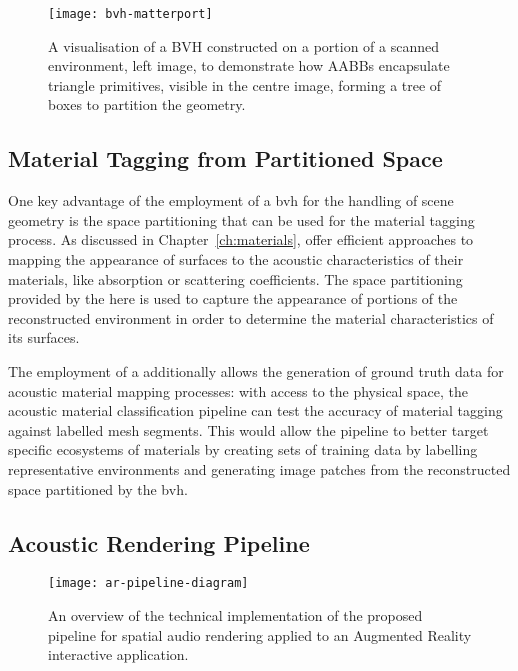 \begin{figure}[htb]
    \centering
    \texttt{[image: bvh-matterport]}
    \caption[A Bounding Volume Hierarchy computed on a real environment]{A visualisation of a BVH constructed on a portion of a scanned environment, left image, to demonstrate how AABBs encapsulate triangle primitives, visible in the centre image, forming a tree of boxes to partition the geometry.}
\label{fig:bvh-visualisation}
\end{figure}

\subsection{Material Tagging from Partitioned Space}
One key advantage of the employment of a \acrshort{bvh} for the handling of scene geometry is the space partitioning that can be used for the material tagging process. As discussed in Chapter~\ref{ch:materials},  offer efficient approaches to mapping the appearance of surfaces to the acoustic characteristics of their materials, like absorption or scattering coefficients. The space partitioning provided by the  here is used to capture the appearance of portions of the reconstructed environment in order to determine the material characteristics of its surfaces.\par
The employment of a  additionally allows the generation of ground truth data for acoustic material mapping processes: with access to the physical space, the acoustic material classification pipeline can test the accuracy of material tagging against labelled mesh segments. This would allow the pipeline to better target specific ecosystems of materials by creating sets of training data by labelling representative environments and generating image patches from the reconstructed space partitioned by the \acrshort{bvh}.

\subsection{Acoustic Rendering Pipeline}
\begin{figure}[htb]
    \centering
    \texttt{[image: ar-pipeline-diagram]}
    \caption{An overview of the technical implementation of the proposed pipeline for spatial audio rendering applied to an Augmented Reality interactive application. }
    \label{fig:ar-pipeline-overview}
\end{figure}

